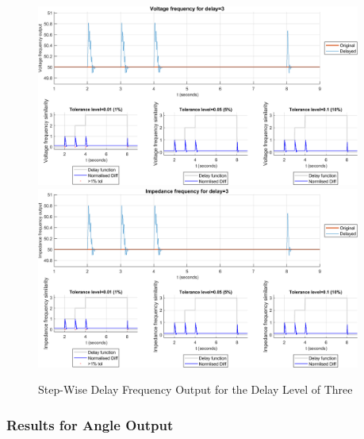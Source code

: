 \begin{figure}
    \caption{Step-Wise Delay Frequency Output for the Delay Level of Three}
    \includegraphics[width=0.95\textwidth]{PMUsim-figures/DelayOf_3/Step_vFrequency.png}    
    \label{fig:PMUsimStep_Three_vFrequency}
    \includegraphics[width=0.95\textwidth]{PMUsim-figures/DelayOf_3/Step_iFrequency.png}    
    \label{fig:PMUsimStep_Three_Frequency}
        \begin{small}
     \end{small}
\end{figure}


\newpage \subsubsection{Results for Angle Output}


